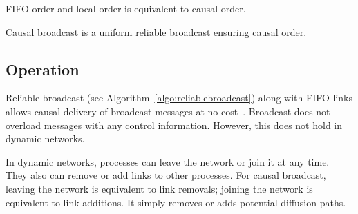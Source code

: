 \begin{theorem}
  FIFO order and local order is equivalent to causal order.
\end{theorem}

\begin{definition}
  Causal broadcast is a uniform reliable broadcast ensuring causal order.
\end{definition}









\subsection{Operation}

Reliable broadcast (see Algorithm~\ref{algo:reliablebroadcast}) along with FIFO
links allows causal delivery of broadcast messages at no
cost~\cite{friedman2004causal}. Broadcast does not overload messages with any
control information. However, this does not hold in dynamic networks.

In dynamic networks, processes can leave the network or join it at any time.
They also can remove or add links to other processes. For causal broadcast,
leaving the network is equivalent to link removals; joining the network is
equivalent to link additions. It simply removes or adds potential diffusion
paths.

